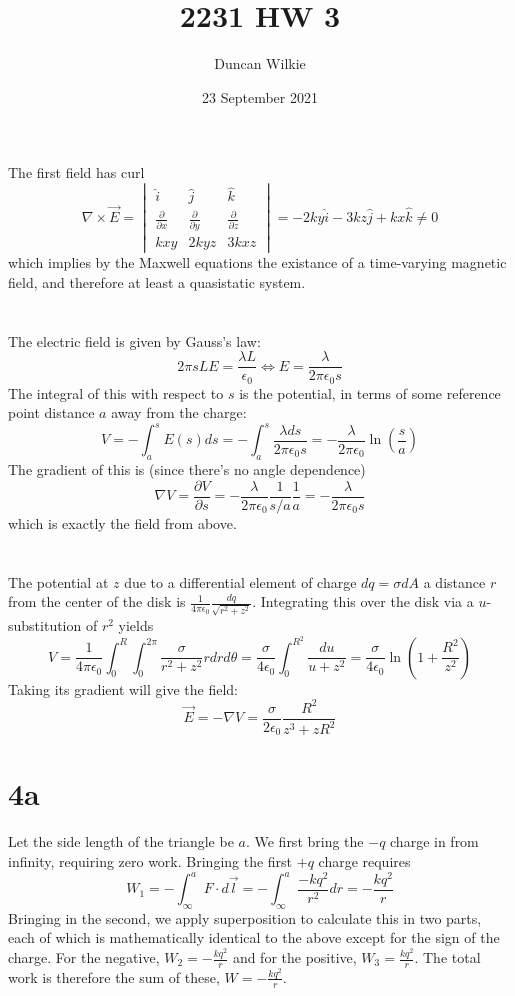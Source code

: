 \documentclass{article}
\title{2231 HW 3}
\author{Duncan Wilkie}
\date{23 September 2021}
\begin{document}
\maketitle

\section{}
The first field has curl
\[\nabla\times\vec{E}=
  \begin{vmatrix} \hat{i} & \hat{j} & \hat{k} \\
    \frac{\partial }{\partial x} & \frac{\partial}{\partial y} &\frac{\partial}{\partial z} \\
    kxy & 2kyz & 3kxz
  \end{vmatrix}
  =-2ky\hat{i}-3kz\hat{j}+kx\hat{k}\neq 0\]
which implies by the Maxwell equations the existance of a time-varying magnetic field, and therefore at least a quasistatic system.
\section{}
The electric field is given by Gauss's law:
\[2\pi sLE=\frac{\lambda L}{\epsilon_0}\Leftrightarrow E=\frac{\lambda}{2\pi\epsilon_0 s}\]
The integral of this with respect to $s$ is the potential, in terms of some reference point distance $a$ away from the charge:
\[V=-\int_a^sE(s)ds=-\int_a^s\frac{\lambda ds}{2\pi\epsilon_0 s}=-\frac{\lambda}{2\pi\epsilon_0}\ln\left(\frac{s}{a}\right)\]
The gradient of this is (since there's no angle dependence)
\[\nabla V=\frac{\partial V}{\partial s}=-\frac{\lambda}{2\pi\epsilon_0}\frac{1}{s/a}\frac{1}{a}=-\frac{\lambda}{2\pi\epsilon_0 s}\]
which is exactly the field from above.
\section{}
The potential at $z$ due to a differential element of charge $dq=\sigma dA$ a distance ${r}$ from the center of the disk is $\frac{1}{4\pi\epsilon_0}\frac{dq}{\sqrt{{r}^2+z^2}}$. Integrating this over the disk via a $u$-substitution of $r^2$ yields \[V=\frac{1}{4\pi\epsilon_0}\int_0^R\int_0^{2\pi}\frac{\sigma}{r^2+z^2}rdrd\theta=\frac{\sigma}{4\epsilon_0}\int_0^{R^2}\frac{du}{u+z^2}=\frac{\sigma}{4\epsilon_0}\ln\left(1+\frac{R^2}{z^2}\right)\]
Taking its gradient will give the field:
\[\vec{E}=-\nabla V=\frac{\sigma}{2\epsilon_0}\frac{R^2}{z^3+zR^2}\]
\section*{4a}
Let the side length of the triangle be $a$. We first bring the $-q$ charge in from infinity, requiring zero work. Bringing the first $+q$ charge requires
\[W_1=-\int_\infty^aF\cdot d\vec{l}=-\int_\infty^a\frac{-kq^2}{r^2}dr=-\frac{kq^2}{r}\]
Bringing in the second, we apply superposition to calculate this in two parts, each of which is mathematically identical to the above except for the sign of the charge. For the negative, $W_2=-\frac{kq^2}{r}$ and for the positive, $W_3=\frac{kq^2}{r}$. The total work is therefore the sum of these, $W=-\frac{kq^2}{r}$.
\end{document}
